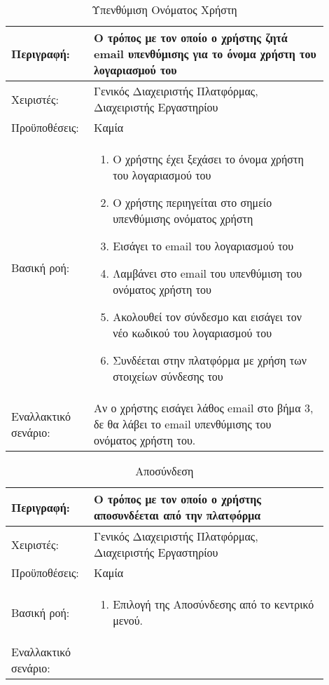 \begin{table}[h]
	\caption{Υπενθύμιση Ονόματος Χρήστη}
	\label{tab:use-case-forgot-username}
	\begin{tabular}{|p{0.2\linewidth}|p{0.7\linewidth}|}
		\hline
		Περιγραφή: & Ο τρόπος με τον οποίο ο χρήστης ζητά email υπενθύμισης για το όνομα χρήστη του λογαριασμού του \\ \hline
		Χειριστές: & Γενικός Διαχειριστής Πλατφόρμας, Διαχειριστής Εργαστηρίου \\ \hline
		Προϋποθέσεις: & Καμία \\ \hline
		Βασική ροή: & 
		\vspace{-0.5cm}
		\begin{enumerate}
			\item Ο χρήστης έχει ξεχάσει το όνομα χρήστη του λογαριασμού του
			\item Ο χρήστης περιηγείται στο σημείο υπενθύμισης ονόματος χρήστη
			\item Εισάγει το email του λογαριασμού του
			\item Λαμβάνει στο email του υπενθύμιση του ονόματος χρήστη του
			\item Ακολουθεί τον σύνδεσμο και εισάγει τον νέο κωδικού του λογαριασμού του
			\item Συνδέεται στην πλατφόρμα με χρήση των στοιχείων σύνδεσης του
		\end{enumerate}\vspace{-0.7cm} \\ \hline
		Εναλλακτικό σενάριο: & Αν ο χρήστης εισάγει λάθος email στο βήμα 3, δε θα λάβει το email υπενθύμισης του ονόματος χρήστη του. \\ \hline
	\end{tabular}
\end{table}

\begin{table}[h]
	\caption{Αποσύνδεση}
	\label{tab:use-case-logout}
	\begin{tabular}{|p{0.2\linewidth}|p{0.7\linewidth}|}
		\hline
		Περιγραφή: & Ο τρόπος με τον οποίο ο χρήστης αποσυνδέεται από την πλατφόρμα \\ \hline
		Χειριστές: & Γενικός Διαχειριστής Πλατφόρμας, Διαχειριστής Εργαστηρίου \\ \hline
		Προϋποθέσεις: & Καμία \\ \hline
		Βασική ροή: & 
		\vspace{-0.5cm}
		\begin{enumerate}
			\item Επιλογή της Αποσύνδεσης από το κεντρικό μενού.
		\end{enumerate}\vspace{-0.7cm} \\ \hline
		Εναλλακτικό σενάριο: & \\ \hline
	\end{tabular}
\end{table}

